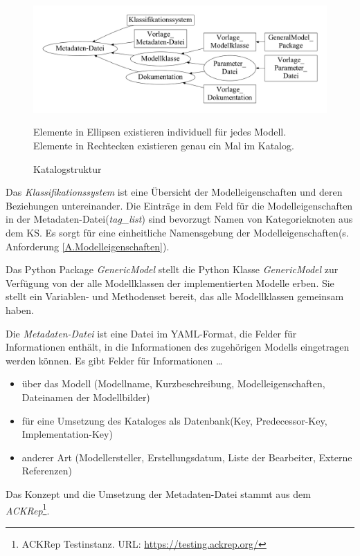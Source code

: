 \begin{figure}[H]
	\centering
	\includegraphics[width=1\linewidth]{Katalogstruktur}
	\caption[Katalogstruktur]{Katalogstruktur}
	\label{fig:Katalogstruktur}
	\medskip
	\small
	Elemente in Ellipsen existieren individuell für jedes Modell. Elemente in Rechtecken existieren genau ein Mal im Katalog.
\end{figure}
%
Das \textit{Klassifikationssystem} ist eine Übersicht der Modelleigenschaften und deren Beziehungen untereinander. Die Einträge in dem Feld für die Modelleigenschaften in der Metadaten-Datei(\textit{tag\_list}) sind bevorzugt Namen von Kategorieknoten aus dem KS. Es sorgt für eine einheitliche Namensgebung der Modelleigenschaften(s. Anforderung \ref{A.Modelleigenschaften}). 

Das Python Package \textit{GenericModel} stellt die Python Klasse \textit{GenericModel} zur Verfügung von der alle Modellklassen der implementierten Modelle erben. Sie stellt ein Variablen- und Methodenset bereit, das alle Modellklassen gemeinsam haben.

Die \textit{Metadaten-Datei} ist eine Datei im YAML-Format, die Felder für Informationen enthält, in die Informationen des zugehörigen Modells eingetragen werden können. Es gibt Felder für Informationen \dots 
\begin{itemize}[label=$\bullet$]
	\item über das Modell (Modellname, Kurzbeschreibung, Modelleigenschaften, Dateinamen der Modellbilder)
	\item für eine Umsetzung des Kataloges als Datenbank(Key, Predecessor-Key, Implementation-Key)
	\item anderer Art (Modellersteller, Erstellungsdatum, Liste der Bearbeiter, Externe Referenzen)
\end{itemize}
Das Konzept und die Umsetzung der Metadaten-Datei stammt aus dem \textit{ACKRep}\footnote{ACKRep Testinstanz. \tiny{URL}\normalsize: \url{https://testing.ackrep.org/}}. 

